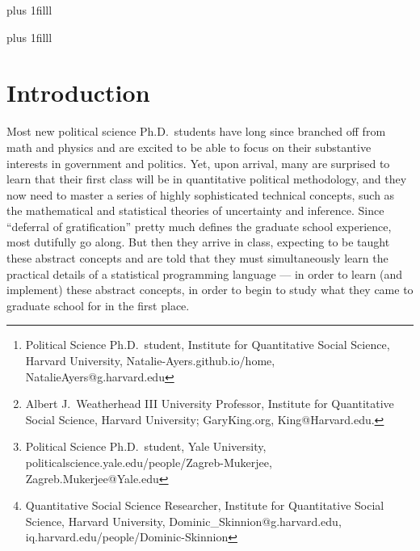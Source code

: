 \documentclass[12pt]{article}
\title{\titl}
\title{\titl} %
\author{Natalie Ayers\thanks{Political Science Ph.D.\ student, Institute for Quantitative Social Science, Harvard University, Natalie-Ayers.github.io/home, NatalieAyers@g.harvard.edu}\and Gary King\thanks{Albert J.\ Weatherhead
III University Professor, Institute for Quantitative Social
Science, Harvard University; GaryKing.org, King@Harvard.edu.}\and Zagreb Mukerjee\thanks{Political Science Ph.D.\ student, Yale University, politicalscience.yale.edu/people/Zagreb-Mukerjee, Zagreb.Mukerjee@Yale.edu} \and Dominic Skinnion\thanks{Quantitative Social Science Researcher, Institute for Quantitative Social Science, Harvard University, Dominic\_Skinnion@g.harvard.edu, iq.harvard.edu/people/Dominic-Skinnion}}
\newcommand{\btVFill}{\vskip0pt plus 1filll}
\theoremstyle{definition}
\begin{document}
\maketitle\thispagestyle{empty}\setcounter{page}{0}
\btVFill
\vspace{-2\baselineskip}
\begin{abstract}
  \noindent Two features of quantitative political methodology make teaching and learning especially difficult: (1) Each new concept of statistics or inference builds on all previous (and sometimes all other relevant) concepts; and (2) motivating substantively oriented students, by teaching these abstract theories simultaneously with the practical details of a statistical programming language (such as R), makes learning each subject harder. We address both problems through a new type of automated teaching tool that helps students see the big theoretical picture and all its separate parts at the same time without having to simultaneously learn to program. This tool, which we make available via one click in a web browser, can be used in a traditional methods class, but is also designed to work without instructor supervision.
  \\
  \newline
  \noindent Words: 2738
\end{abstract}
\btVFill
\clearpage
{}\baselineskip

\section{Introduction}\label{s:intro}

Most new political science Ph.D.\ students have long since branched off from math and physics and are excited to be able to focus on their substantive interests in government and politics. Yet, upon arrival, many are surprised to learn that their first class will be in quantitative political methodology, and they now need to master a series of highly sophisticated technical concepts, such as the mathematical and statistical theories of uncertainty and inference. Since ``deferral of gratification'' pretty much defines the graduate school experience, most dutifully go along. But then they arrive in class, expecting to be taught these abstract concepts and are told that they must simultaneously learn the practical details of a statistical programming language --- in order to learn (and implement) these abstract concepts, in order to begin to study what they came to graduate school for in the first place.
\end{document}
